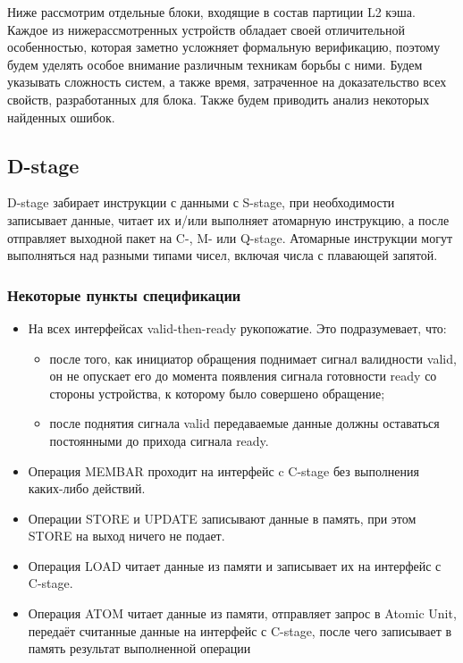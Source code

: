 Ниже рассмотрим отдельные блоки, входящие в состав партиции L2 кэша. Каждое из нижерассмотренных устройств обладает своей отличительной особенностью, которая заметно усложняет формальную верификацию, поэтому будем уделять особое внимание различным техникам борьбы с ними. Будем указывать сложность систем, а также время, затраченное на доказательство всех свойств, разработанных для блока. Также будем приводить анализ некоторых найденных ошибок.

\subsection{D-stage}

\tab D-stage забирает инструкции с данными с S-stage, при необходимости записывает данные, читает их и/или выполняет атомарную инструкцию, а после отправляет выходной пакет на C-, M- или Q-stage. Атомарные инструкции могут выполняться над разными типами чисел, включая числа с плавающей запятой. 

\subsubsection*{Некоторые пункты спецификации}

\begin{itemize}
    \item На всех интерфейсах valid-then-ready рукопожатие. Это подразумевает, что:
    \begin{itemize}
        \item после того, как инициатор обращения поднимает сигнал валидности valid, он не опускает его до момента появления сигнала готовности ready со стороны устройства, к которому было совершено обращение;
        \item после поднятия сигнала valid передаваемые данные должны оставаться постоянными до прихода сигнала ready.
    \end{itemize}
    \item Операция MEMBAR проходит на интерфейс c C-stage без выполнения каких-либо действий.
    \item Операции STORE и UPDATE записывают данные в память, при этом STORE на выход ничего не подает. 
    \item Операция LOAD читает данные из памяти и записывает их на интерфейс с C-stage.
    \item Операция ATOM читает данные из памяти, отправляет запрос в Atomic Unit, передаёт считанные данные на интерфейс с C-stage, после чего записывает в память результат выполненной операции
\end{itemize}

